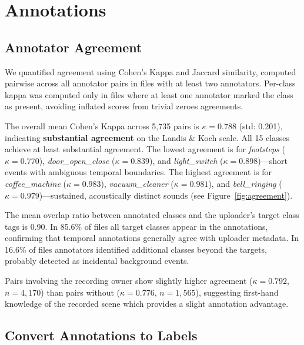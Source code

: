 \documentclass{article}
\begin{document}
\section{Annotations}

\subsection{Annotator Agreement}
We quantified agreement using Cohen's Kappa and Jaccard similarity, computed pairwise across all annotator pairs in files with at least two annotators. Per-class kappa was computed only in files where at least one annotator marked the class as present, avoiding inflated scores from trivial zeroes agreements.

The overall mean Cohen's Kappa across 5,735 pairs is $\kappa = 0.788$ (std: 0.201), indicating \textbf{substantial agreement} on the Landis \& Koch scale. All 15 classes achieve at least substantial agreement. The lowest agreement is for \textit{footsteps} ($\kappa = 0.770$), \textit{door\_open\_close} ($\kappa = 0.839$), and \textit{light\_switch} ($\kappa = 0.898$)---short events with ambiguous temporal boundaries. The highest agreement is for \textit{coffee\_machine} ($\kappa = 0.983$), \textit{vacuum\_cleaner} ($\kappa = 0.981$), and \textit{bell\_ringing} ($\kappa = 0.979$)---sustained, acoustically distinct sounds (see Figure~\ref{fig:agreement}).

The mean overlap ratio between annotated classes and the uploader's target class tags is 0.90. In 85.6\% of files all target classes appear in the annotations, confirming that temporal annotations generally agree with uploader metadata. In 16.6\% of files annotators identified additional classes beyond the targets, probably detected as incidental background events.

Pairs involving the recording owner show slightly higher agreement ($\kappa = 0.792$, $n = 4{,}170$) than pairs without ($\kappa = 0.776$, $n = 1{,}565$), suggesting first-hand knowledge of the recorded scene which provides a slight annotation advantage.


\subsection{Convert Annotations to Labels}
\end{document}
